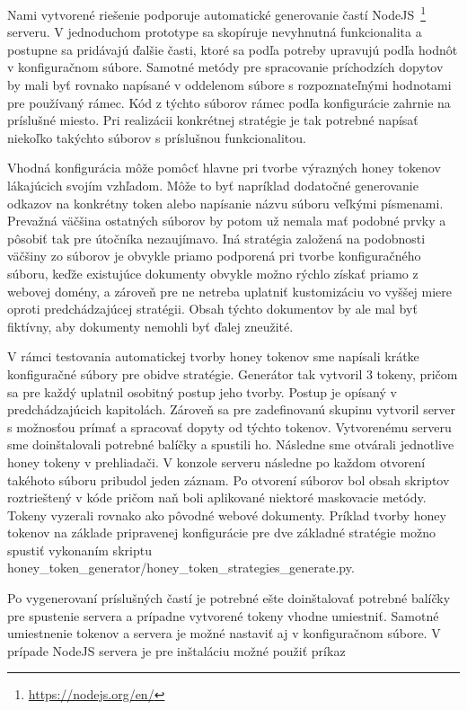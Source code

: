 \documentclass[conference, 11pt,slovak,a4paper,twoside]{IEEEtran}
\begin{document}
Nami vytvorené riešenie podporuje automatické generovanie častí NodeJS~\footnote{\url{https://nodejs.org/en/}} serveru. V jednoduchom prototype sa skopíruje nevyhnutná funkcionalita a postupne sa pridávajú ďalšie časti, ktoré sa podľa potreby upravujú podľa hodnôt v konfiguračnom súbore. Samotné metódy pre spracovanie príchodzích dopytov by mali byť rovnako napísané v oddelenom súbore s rozpoznateľnými hodnotami pre používaný rámec. Kód z týchto súborov rámec podľa konfigurácie zahrnie na príslušné miesto. Pri realizácii konkrétnej stratégie je tak potrebné napísať niekoľko takýchto súborov s príslušnou funkcionalitou. 

Vhodná konfigurácia môže pomôcť hlavne pri tvorbe výrazných honey tokenov lákajúcich svojím vzhľadom. Môže to byť napríklad dodatočné generovanie odkazov na konkrétny token alebo napísanie názvu súboru veľkými písmenami. Prevažná väčšina ostatných súborov by potom už nemala mať podobné prvky a pôsobiť tak pre útočníka nezaujímavo. Iná stratégia založená na podobnosti väčšiny zo súborov je obvykle priamo podporená pri tvorbe konfiguračného súboru, keďže existujúce dokumenty obvykle možno rýchlo získať priamo z webovej domény, a zároveň pre ne netreba uplatniť kustomizáciu vo vyššej miere oproti predchádzajúcej stratégii. Obsah týchto dokumentov by ale mal byť fiktívny, aby dokumenty nemohli byť ďalej zneužité.

V rámci testovania automatickej tvorby honey tokenov sme napísali krátke konfiguračné súbory pre obidve stratégie. Generátor tak vytvoril 3 tokeny, pričom sa pre každý uplatnil osobitný postup jeho tvorby. Postup je opísaný v predchádzajúcich kapitolách. Zároveň sa pre zadefinovanú skupinu vytvoril server s možnosťou prímať a spracovať dopyty od týchto tokenov. Vytvorenému serveru sme doinštalovali potrebné balíčky a spustili ho. Následne sme otvárali jednotlive honey tokeny v prehliadači. V konzole serveru následne po každom otvorení takéhoto súboru pribudol jeden záznam. Po otvorení súborov bol obsah skriptov roztrieštený v kóde pričom naň boli aplikované niektoré maskovacie metódy. Tokeny vyzerali rovnako ako pôvodné webové dokumenty. Príklad tvorby honey tokenov na základe pripravenej konfigurácie pre dve základné stratégie možno spustiť vykonaním skriptu honey\_token\_generator/honey\_token\_strategies\_generate.py. 

Po vygenerovaní príslušných častí je potrebné ešte doinštalovať potrebné balíčky pre spustenie servera a prípadne vytvorené tokeny vhodne umiestniť. Samotné umiestnenie tokenov a servera je možné nastaviť aj v konfiguračnom súbore. V prípade NodeJS servera je pre inštaláciu možné použiť príkaz 
\end{document}
